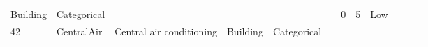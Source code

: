 \documentclass[11pt]{article}
\begin{document}
\begin{longtable}[]{@{}llllllllllll@{}}
\begin{minipage}[t]{0.04\columnwidth}
Building\strut
\end{minipage} & \begin{minipage}[t]{0.04\columnwidth}\raggedright\strut
Categorical\strut
\end{minipage} & \begin{minipage}[t]{0.04\columnwidth}\raggedright\strut
\strut
\end{minipage} & \begin{minipage}[t]{0.04\columnwidth}\raggedright\strut
\strut
\end{minipage} & \begin{minipage}[t]{0.04\columnwidth}\raggedright\strut
\strut
\end{minipage} & \begin{minipage}[t]{0.04\columnwidth}\raggedright\strut
\strut
\end{minipage} & \begin{minipage}[t]{0.04\columnwidth}\raggedright\strut
0\strut
\end{minipage} & \begin{minipage}[t]{0.04\columnwidth}\raggedright\strut
5\strut
\end{minipage} & \begin{minipage}[t]{0.04\columnwidth}\raggedright\strut
Low\strut
\end{minipage}\tabularnewline
\begin{minipage}[t]{0.04\columnwidth}\raggedright\strut
42\strut
\end{minipage} & \begin{minipage}[t]{0.04\columnwidth}\raggedright\strut
CentralAir\strut
\end{minipage} & \begin{minipage}[t]{0.04\columnwidth}\raggedright\strut
Central air conditioning\strut
\end{minipage} & \begin{minipage}[t]{0.04\columnwidth}\raggedright\strut
Building\strut
\end{minipage} & \begin{minipage}[t]{0.04\columnwidth}\raggedright\strut
Categorical\strut
\end{minipage} & \begin{minipage}[t]{0.04\columnwidth}\raggedright\strut
\strut
\end{minipage} & \begin{minipage}[t]{0.04\columnwidth}\raggedright\strut
\strut
\end{minipage} & \begin{minipage}[t]{0.04\columnwidth}\raggedright\strut

\end{minipage}
\end{longtable}
\end{document}
